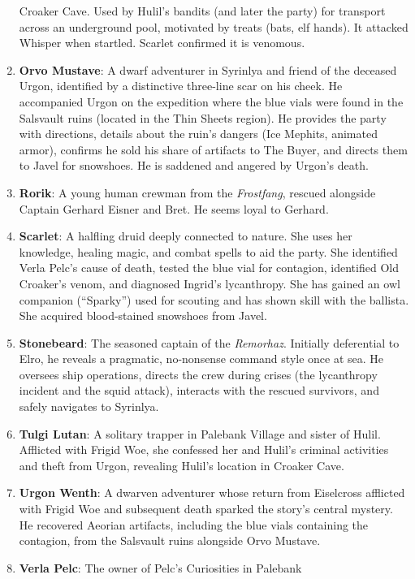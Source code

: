 \documentclass[
  letterpaper,12pt,twoside,twocolumn,openany,
  nodeprecatedcode,bg=full]{dndbook}
\begin{document}
\begin{enumerate}
  Croaker Cave. Used by Hulil's bandits (and later the party) for
  transport across an underground pool, motivated by treats (bats, elf
  hands). It attacked Whisper when startled. Scarlet confirmed it is
  venomous.
\item
  \textbf{Orvo Mustave}: A dwarf adventurer in Syrinlya and friend of
  the deceased Urgon, identified by a distinctive three-line scar on his
  cheek. He accompanied Urgon on the expedition where the blue vials
  were found in the Salsvault ruins (located in the Thin Sheets region).
  He provides the party with directions, details about the ruin's
  dangers (Ice Mephits, animated armor), confirms he sold his share of
  artifacts to The Buyer, and directs them to Javel for snowshoes. He is
  saddened and angered by Urgon's death.
\item
  \textbf{Rorik}: A young human crewman from the \emph{Frostfang},
  rescued alongside Captain Gerhard Eisner and Bret. He seems loyal to
  Gerhard.
\item
  \textbf{Scarlet}: A halfling druid deeply connected to nature. She
  uses her knowledge, healing magic, and combat spells to aid the party.
  She identified Verla Pelc's cause of death, tested the blue vial for
  contagion, identified Old Croaker's venom, and diagnosed Ingrid's
  lycanthropy. She has gained an owl companion (``Sparky'') used for
  scouting and has shown skill with the ballista. She acquired
  blood-stained snowshoes from Javel.
\item
  \textbf{Stonebeard}: The seasoned captain of the \emph{Remorhaz}.
  Initially deferential to Elro, he reveals a pragmatic, no-nonsense
  command style once at sea. He oversees ship operations, directs the
  crew during crises (the lycanthropy incident and the squid attack),
  interacts with the rescued survivors, and safely navigates to
  Syrinlya.
\item
  \textbf{Tulgi Lutan}: A solitary trapper in Palebank Village and
  sister of Hulil. Afflicted with Frigid Woe, she confessed her and
  Hulil's criminal activities and theft from Urgon, revealing Hulil's
  location in Croaker Cave.
\item
  \textbf{Urgon Wenth}: A dwarven adventurer whose return from
  Eiselcross afflicted with Frigid Woe and subsequent death sparked the
  story's central mystery. He recovered Aeorian artifacts, including the
  blue vials containing the contagion, from the Salsvault ruins
  alongside Orvo Mustave.
\item
  \textbf{Verla Pelc}: The owner of Pelc's Curiosities in Palebank

\end{enumerate}
\end{document}
